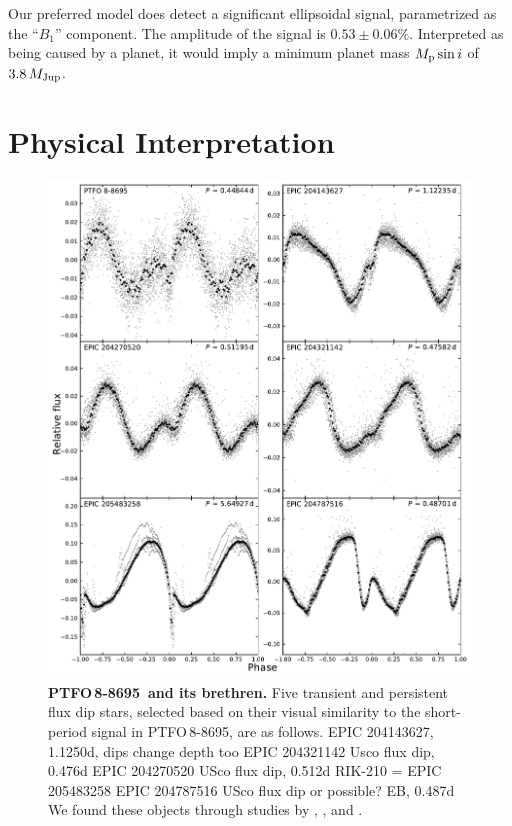 \documentclass[12pt,twocolumn,tighten]{aastex62}
\newcommand{\ptfo}{PTFO$\,$8-8695}
\begin{document}
Our preferred model does detect a significant ellipsoidal signal,
parametrized as the ``$B_1$'' component.  The amplitude of the signal
is $0.53 \pm 0.06\%$.  Interpreted as being caused by a planet, it
would imply a minimum planet mass $M_{\rm p} \sin i$ of $3.8\,M_{\rm
Jup}$.




\section{Physical Interpretation}

\begin{figure}[hbtp]
	\begin{center}
		\leavevmode
		\includegraphics[width=1\textwidth]{f7.pdf}
	\end{center}
	\vspace{-0.7cm}
  \caption{ {\bf \ptfo\ and its brethren.}
  	Five transient and persistent flux dip stars, selected based on their visual similarity to the short-period signal in \ptfo, are as follows.
  	EPIC 204143627, 1.1250d, dips change depth too
  	EPIC 204321142  Usco flux dip, 0.476d
  	EPIC 204270520  USco flux dip, 0.512d
  	RIK-210 = EPIC 205483258
 	EPIC 204787516  USco flux dip or possible? EB, 0.487d
 	We found these objects through studies by \citet{stauffer_orbiting_2017}, \citet{david_transient_2017}, and \citet{rebull_usco_2018}.
		\label{fig:brethren}
	}
\end{figure}
\end{document}
